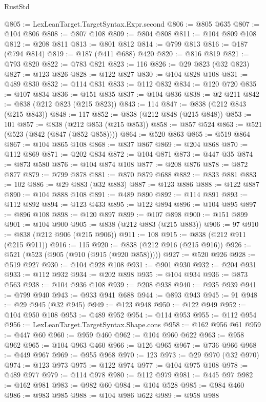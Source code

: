 \begin{lexlean}{RustStd}
\begin{coremodule}
{\begin{coremodule}
{{{{{{{{{{{{{{{{{{{{{{{{{{{{{{{{{{{{{{{{{{{{{{{{{{{{{{{@805 := LexLeanTarget.TargetSyntax.Expr.second
@806 := @805 @635
@807 := @104 @806
@808 := @807 @108
@809 := @804 @808
@811 := @104 @809 @108
@812 := @208 @811
@813 := @801 @812
@814 := @799 @813
@816 := @187 (@794 @814)
@819 := @187 (@411 @688) @420
@820 := @816 @819
@821 := @793 @820
@822 := @783 @821
@823 := 116
@826 := @29 @823 (@32 @823)
@827 := @123 @826
@828 := @122 @827
@830 := @104 @828 @108
@831 := @489 @830
@832 := @114 @831
@833 := @112 @832
@834 := @120 @720
@835 := @107 @834
@836 := @151 @835
@837 := @104 @836
@838 := @2 @211
@842 := @838 (@212 @823 (@215 @823))
@843 := 114
@847 := @838 (@212 @843 (@215 @843))
@848 := 117
@852 := @838 (@212 @848 (@215 @848))
@853 := 101
@857 := @838 (@212 @853 (@215 @853))
@858 := @857 @524
@863 := @521 (@523 (@842 (@847 (@852 @858))))
@864 := @520 @863
@865 := @519 @864
@867 := @104 @865 @108
@868 := @837 @867
@869 := @204 @868
@870 := @112 @869
@871 := @202 @834
@872 := @104 @871
@873 := @447 @35
@874 := @873 @580
@876 := @104 @874 @108
@877 := @208 @876
@878 := @872 @877
@879 := @799 @878
@881 := @870 @879 @688
@882 := @833 @881
@883 := 102
@886 := @29 @883 (@32 @883)
@887 := @123 @886
@888 := @122 @887
@890 := @104 @888 @108
@891 := @489 @890
@892 := @114 @891
@893 := @112 @892
@894 := @123 @433
@895 := @122 @894
@896 := @104 @895
@897 := @896 @108
@898 := @120 @897
@899 := @107 @898
@900 := @151 @899
@901 := @104 @900
@905 := @838 (@212 @883 (@215 @883))
@906 := 97
@910 := @838 (@212 @906 (@215 @906))
@911 := 108
@915 := @838 (@212 @911 (@215 @911))
@916 := 115
@920 := @838 (@212 @916 (@215 @916))
@926 := @521 (@523 (@905 (@910 (@915 (@920 @858)))))
@927 := @520 @926
@928 := @519 @927
@930 := @104 @928 @108
@931 := @901 @930
@932 := @204 @931
@933 := @112 @932
@934 := @202 @898
@935 := @104 @934
@936 := @873 @563
@938 := @104 @936 @108
@939 := @208 @938
@940 := @935 @939
@941 := @799 @940
@943 := @933 @941 @688
@944 := @893 @943
@945 := 91
@948 := @29 @945 (@32 @945)
@949 := @123 @948
@950 := @122 @949
@952 := @104 @950 @108
@953 := @489 @952
@954 := @114 @953
@955 := @112 @954
@956 := LexLeanTarget.TargetSyntax.Shape.cons
@958 := @162 @956 @61
@959 := @447 @60
@960 := @959 @460
@962 := @104 @960 @622
@963 := @958 @962
@965 := @104 @963 @460
@966 := @126 @965
@967 := @736 @966
@968 := @449 @967
@969 := @955 @968
@970 := 123
@973 := @29 @970 (@32 @970)
@974 := @123 @973
@975 := @122 @974
@977 := @104 @975 @108
@978 := @489 @977
@979 := @114 @978
@980 := @112 @979
@981 := @445 @97
@982 := @162 @981
@983 := @982 @60
@984 := @104 @528
@985 := @984 @460
@986 := @983 @985
@988 := @104 @986 @622
@989 := @958 @988
}}}}}}}}}}}}}}}}}}}}}}}}}}}}}}}}}}}}}}}}}}}}}}}}}}}}}}}
\end{coremodule}}
\end{coremodule}
\end{lexlean}
